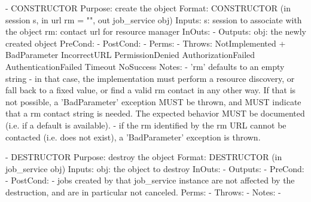  \begin{myspec}
    - CONSTRUCTOR
      Purpose:  create the object
      Format:   CONSTRUCTOR       (in  session       s,
                                   in  url           rm = "",
                                   out job_service   obj)
      Inputs:   s:                 session to associate with
                                   the object
                rm:                contact url for resource 
                                   manager
      InOuts:   -
      Outputs:  obj:               the newly created object
      PreCond:  -
      PostCond: -
      Perms:    -
      Throws:   NotImplemented
+               BadParameter
                IncorrectURL
                PermissionDenied
                AuthorizationFailed
                AuthenticationFailed
                Timeout
                NoSuccess
      Notes:    - 'rm' defaults to an empty string - in that
                  case, the implementation must perform a
                  resource discovery, or fall back to a fixed 
                  value, or find a valid  rm contact in any 
                  other way.  If that is not possible, a 
                  'BadParameter' exception MUST be thrown, and 
                  MUST indicate that a rm contact string is 
                  needed.  The expected behavior MUST be 
                  documented (i.e. if a default is available).
                - if the rm identified by the rm URL cannot be
                  contacted (i.e. does not exist), a
                  'BadParameter' exception is thrown.
 
 
    - DESTRUCTOR
      Purpose:  destroy the object
      Format:   DESTRUCTOR        (in  job_service   obj)
      Inputs:   obj:               the object to destroy
      InOuts:   -
      Outputs:  -
      PreCond:  -
      PostCond: - jobs created by that job_service instance 
                  are not affected by the destruction, and are
                  in particular not canceled.
      Perms:    -
      Throws:   - 
      Notes:    - 
 

\end{myspec}
